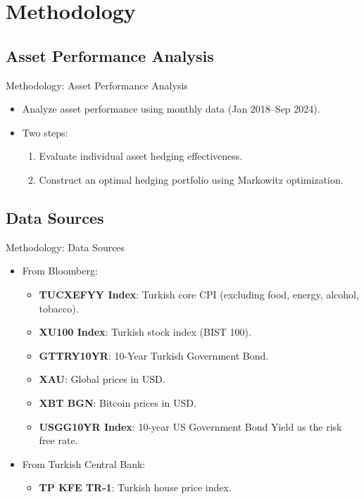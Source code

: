\documentclass{beamer}
\begin{document}
\section{Methodology}
\subsection{Asset Performance Analysis}
\begin{frame}{Methodology: Asset Performance Analysis}
\begin{itemize}
\item Analyze asset performance using monthly data (Jan 2018--Sep 2024).
\item Two steps:
\begin{enumerate}
\item Evaluate individual asset hedging effectiveness.
\item Construct an optimal hedging portfolio using Markowitz optimization.
\end{enumerate}
\end{itemize}
\end{frame}

\subsection{Data Sources}
\begin{frame}{Methodology: Data Sources}
\begin{itemize}
\item From Bloomberg:
\begin{itemize}
\item \textbf{TUCXEFYY Index}: Turkish core CPI (excluding food, energy,
alcohol, tobacco).
\item \textbf{XU100 Index}: Turkish stock index (BIST 100).
\item \textbf{GTTRY10YR}: 10-Year Turkish Government Bond.
\item \textbf{XAU}: Global prices in USD. 
\item \textbf{XBT BGN}: Bitcoin prices in USD.
\item \textbf{USGG10YR Index}: 10-year US Government Bond Yield as the risk free rate.
\end{itemize}
\item From Turkish Central Bank:
\begin{itemize}
\item \textbf{TP KFE TR-1}: Turkish house price index.
\end{itemize}
\end{itemize}
\end{frame}
\end{document}
